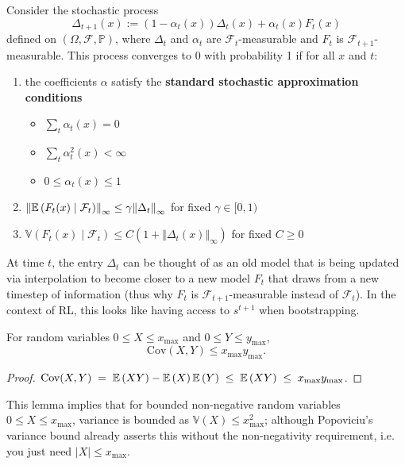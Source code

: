 \documentclass[twoside,10pt]{report}
\begin{document}
\begin{thrm}[Jaakkola et al.]
Consider the stochastic process
\[
\Delta_{t+1}(x) := (1-\alpha_{t}(x)) \Delta_{t}(x) + \alpha_{t}(x) F_{t}(x)
\] defined on $(\Omega,\mathcal{F},\mathbb{P})$, where $\Delta_{t}$ and $\alpha_{t}$ are $\mathcal{F}_{t}$-measurable and $F_{t}$ is $\mathcal{F}_{t+1}$-measurable. This process converges to 0 with probability 1 if for all $x$ and $t$:
\begin{enumerate}
	\item the coefficients $\alpha$ satisfy the \textbf{standard stochastic approximation conditions}
		\begin{itemize}
			\item $\sum_{t}\alpha_{t}(x) = 0$ 
			\item $\sum_{t}\alpha_{t}^2(x) < \infty$ 
			\item $0 \leq \alpha_{t}(x) \leq 1$
		\end{itemize}
	\item ${\Vert{\mathbb{E} \left(  F_{t}(x) \;|\; \mathcal{F}_{t}  \right)}\Vert}_{\infty} \leq \gamma {\Vert{\Delta_{t}}\Vert}_{\infty}$ for fixed $\gamma \in [0, 1)$
	\item $\mathbb{V}\left( F_{t}(x) \;|\; \mathcal{F}_{t} \right) \leq C \left( 1 + {\Vert{\Delta_{t}(x)}\Vert}_{\infty} \right)$ for fixed $C \geq 0$
\end{enumerate}
\end{thrm}

At time $t$, the entry $\Delta_{t}$ can be thought of as an old model that is being updated via interpolation to become closer to a new model $F_{t}$ that draws from a new timestep of information (thus why $F_{t}$ is $\mathcal{F}_{t+1}$-measurable instead of $\mathcal{F}_{t}$). In the context of RL, this looks like having access to $s^{t+1}$ when bootstrapping.

\begin{lem}
For random variables $0 \leq X \leq x_{\text{max}}$ and $0 \leq Y \leq y_{\text{max}}$,
\[
\text{Cov}(X,Y) \leq x_{\text{max}} y_{\text{max}}.
\]
\end{lem}
\begin{proof}
	$\text{Cov}(X,Y) \;=\; \mathbb{E} \left(  XY  \right) - \mathbb{E} \left(  X  \right)\mathbb{E} \left(  Y  \right) \;\leq\; \mathbb{E} \left(  XY  \right) \;\leq\; x_{\text{max}}y_{\text{max}}$.
\end{proof}

\begin{note}[]
This lemma implies that for bounded non-negative random variables $0 \leq X \leq x_{\text{max}}$, variance is bounded as $\mathbb{V}(X) \leq x_{\text{max}}^2$; although Popoviciu's variance bound already asserts this without the non-negativity requirement, i.e. you just need $|X| \leq x_{\text{max}}$.
\end{note}
\end{document}
